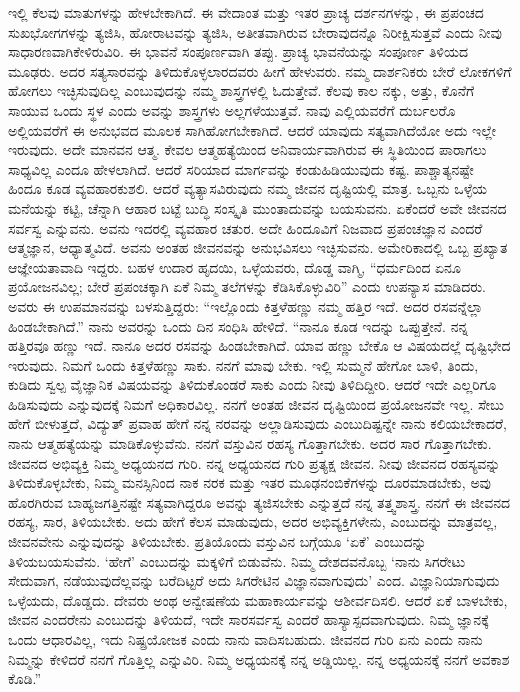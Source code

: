 \vskip 0.2cm 

ಇಲ್ಲಿ ಕೆಲವು ಮಾತುಗಳನ್ನು ಹೇಳಬೇಕಾಗಿದೆ. ಈ ವೇದಾಂತ ಮತ್ತು ಇತರ ಪ್ರಾಚ್ಯ ದರ್ಶನಗಳನ್ನು, ಈ ಪ್ರಪಂಚದ ಸುಖಭೋಗಗಳನ್ನು ತ್ಯಜಿಸಿ, ಹೋರಾಟವನ್ನು ತ್ಯಜಿಸಿ, ಅತೀತವಾಗಿರುವ ಬೇರಾವುದನ್ನೊ ನಿರೀಕ್ಷಿಸುತ್ತವೆ ಎಂದು ನೀವು ಸಾಧಾರಣವಾಗಿ\break ಕೇಳಿರುವಿರಿ. ಈ ಭಾವನೆ ಸಂಪೂರ್ಣವಾಗಿ ತಪ್ಪು. ಪ್ರಾಚ್ಯ ಭಾವನೆಯನ್ನು ಸಂಪೂರ್ಣ ತಿಳಿಯದ ಮೂಢರು. ಅದರ ಸತ್ಯಸಾರವನ್ನು ತಿಳಿದುಕೊಳ್ಳಲಾರದವರು ಹೀಗೆ ಹೇಳುವರು. ನಮ್ಮ ದಾರ್ಶನಿಕರು ಬೇರೆ ಲೋಕಗಳಿಗೆ ಹೋಗಲು ಇಚ್ಛಿಸುವುದಿಲ್ಲ ಎಂಬುವುದನ್ನು ನಮ್ಮ ಶಾಸ್ತ್ರಗಳಲ್ಲಿ ಓದುತ್ತೇವೆ. ಕೆಲವು ಕಾಲ ನಕ್ಕು, ಅತ್ತು, ಕೊನೆಗೆ ಸಾಯುವ ಒಂದು ಸ್ಥಳ ಎಂದು ಅವನ್ನು ಶಾಸ್ತ್ರಗಳು ಅಲ್ಲಗಳೆಯುತ್ತವೆ. ನಾವು ಎಲ್ಲಿಯವರೆಗೆ ದುರ್ಬಲರೊ ಅಲ್ಲಿಯವರೆಗೆ ಈ ಅನುಭವದ ಮೂಲಕ ಸಾಗಿಹೋಗಬೇಕಾಗಿದೆ. ಆದರೆ ಯಾವುದು ಸತ್ಯವಾಗಿದೆಯೋ ಅದು ಇಲ್ಲೇ ಇರುವುದು. ಅದೇ ಮಾನವನ ಆತ್ಮ. ಕೇವಲ ಆತ್ಮಹತ್ಯೆಯಿಂದ ಅನಿವಾರ್ಯವಾಗಿರುವ ಈ ಸ್ಥಿತಿಯಿಂದ ಪಾರಾಗಲು ಸಾಧ್ಯವಿಲ್ಲ ಎಂದೂ ಹೇಳಲಾಗಿದೆ. ಆದರೆ ಸರಿಯಾದ ಮಾರ್ಗವನ್ನು ಕಂಡುಹಿಡಿಯುವುದು ಕಷ್ಟ. ಪಾಶ್ಚಾತ್ಯನಷ್ಟೇ ಹಿಂದೂ ಕೂಡ ವ್ಯವಹಾರಕುಶಲಿ. ಆದರೆ ವ್ಯತ್ಯಾಸವಿರುವುದು ನಮ್ಮ ಜೀವನ ದೃಷ್ಟಿಯಲ್ಲಿ ಮಾತ್ರ. ಒಬ್ಬನು ಒಳ್ಳೆಯ ಮನೆಯನ್ನು ಕಟ್ಟಿ, ಚೆನ್ನಾಗಿ ಆಹಾರ ಬಟ್ಟೆ ಬುದ್ಧಿ ಸಂಸ್ಕೃತಿ ಮುಂತಾದುವನ್ನು ಬಯಸುವನು. ಏಕೆಂದರೆ ಅವೇ ಜೀವನದ ಸರ್ವಸ್ವ ಎನ್ನುವನು. ಅವನು ಇದರಲ್ಲಿ ವ್ಯವಹಾರ ಚತುರ. ಅದೇ ಹಿಂದೂವಿಗೆ ನಿಜವಾದ ಪ್ರಪಂಚಜ್ಞಾನ ಎಂದರೆ ಆತ್ಮಜ್ಞಾನ, ಆಧ್ಯಾತ್ಮವಿದೆ. ಅವನು ಅಂತಹ ಜೀವನವನ್ನು ಅನುಭವಿಸಲು ಇಚ್ಛಿಸುವನು. ಅಮೇರಿಕಾದಲ್ಲಿ ಒಬ್ಬ ಪ್ರಖ್ಯಾತ ಆಜ್ಞೇಯತಾವಾದಿ ಇದ್ದರು. ಬಹಳ ಉದಾರ ಹೃದಯಿ, ಒಳ್ಳೆಯವರು, ದೊಡ್ಡ ವಾಗ್ಮಿ, “ಧರ್ಮದಿಂದ ಏನೂ ಪ್ರಯೋಜನವಿಲ್ಲ; ಬೇರೆ ಪ್ರಪಂಚಕ್ಕಾಗಿ ಏಕೆ ನಿಮ್ಮ ತಲೆಗಳನ್ನು ಕೆಡಿಸಿಕೊಳ್ಳುವಿರಿ” ಎಂದು ಉಪನ್ಯಾಸ ಮಾಡಿದರು. ಅವರು ಈ ಉಪಮಾನವನ್ನು ಬಳಸುತ್ತಿದ್ದರು: “ಇಲ್ಲೊಂದು ಕಿತ್ತಳೆಹಣ್ಣು ನಮ್ಮ ಹತ್ತಿರ ಇದೆ. ಅದರ ರಸವನ್ನೆಲ್ಲಾ ಹಿಂಡಬೇಕಾಗಿದೆ.” ನಾನು ಅವರನ್ನು ಒಂದು ದಿನ ಸಂಧಿಸಿ ಹೇಳಿದೆ. “ನಾನೂ ಕೂಡ ಇದನ್ನು ಒಪ್ಪುತ್ತೇನೆ. ನನ್ನ ಹತ್ತಿರವೂ ಹಣ್ಣು ಇದೆ. ನಾನೂ ಅದರ ರಸವನ್ನು ಹಿಂಡಬೇಕಾಗಿದೆ. ಯಾವ ಹಣ್ಣು ಬೇಕೊ ಆ ವಿಷಯದಲ್ಲೆ ದೃಷ್ಟಿಭೇದ ಇರುವುದು. ನಿಮಗೆ ಒಂದು ಕಿತ್ತಳೆಹಣ್ಣು ಸಾಕು. ನನಗೆ ಮಾವು ಬೇಕು. ಇಲ್ಲಿ ಸುಮ್ಮನೆ ಹೇಗೋ ಬಾಳಿ, ತಿಂದು, ಕುಡಿದು ಸ್ವಲ್ಪ ವೈಜ್ಞಾನಿಕ ವಿಷಯವನ್ನು ತಿಳಿದುಕೊಂಡರೆ ಸಾಕು ಎಂದು ನೀವು ತಿಳಿದಿದ್ದೀರಿ. ಆದರೆ ಇದೇ ಎಲ್ಲರಿಗೂ ಹಿಡಿಸುವುದು ಎನ್ನುವುದಕ್ಕೆ ನಿಮಗೆ ಅಧಿಕಾರವಿಲ್ಲ. ನನಗೆ ಅಂತಹ ಜೀವನ ದೃಷ್ಟಿಯಿಂದ ಪ್ರಯೋಜನವೇ ಇಲ್ಲ. ಸೇಬು ಹೇಗೆ ಬೀಳುತ್ತದೆ, ವಿದ್ಯುತ್​ ಪ್ರವಾಹ ಹೇಗೆ ನನ್ನ ನರವನ್ನು ಅಲ್ಲಾಡಿಸುವುದು ಎಂಬುದಿಷ್ಟನ್ನೇ ನಾನು ಕಲಿಯಬೇಕಾದರೆ, ನಾನು ಆತ್ಮಹತ್ಯೆಯನ್ನು ಮಾಡಿಕೊಳ್ಳುವೆನು. ನನಗೆ ವಸ್ತುವಿನ ರಹಸ್ಯ ಗೊತ್ತಾಗಬೇಕು. ಅದರ ಸಾರ ಗೊತ್ತಾಗಬೇಕು. ಜೀವನದ ಅಭಿವ್ಯಕ್ತಿ ನಿಮ್ಮ ಅಧ್ಯಯನದ ಗುರಿ. ನನ್ನ ಅಧ್ಯಯನದ ಗುರಿ ಪ್ರತ್ಯಕ್ಷ ಜೀವನ. ನೀವು ಜೀವನದ ರಹಸ್ಯವನ್ನು ತಿಳಿದುಕೊಳ್ಳಬೇಕು, ನಿಮ್ಮ ಮನಸ್ಸಿನಿಂದ ನಾಕ ನರಕ ಮತ್ತು ಇತರ ಮೂಢನಂಬಿಕೆಗಳನ್ನು ದೂರಮಾಡಬೇಕು, ಅವು ಹೊರಗಿರುವ ಬಾಹ್ಯಜಗತ್ತಿನಷ್ಟೇ ಸತ್ಯವಾಗಿದ್ದರೂ ಅವನ್ನು ತ್ಯಜಿಸಬೇಕು ಎನ್ನುತ್ತದೆ ನನ್ನ ತತ್ತ್ವಶಾಸ್ತ್ರ. ನನಗೆ ಈ ಜೀವನದ ರಹಸ್ಯ, ಸಾರ, ತಿಳಿಯಬೇಕು. ಅದು ಹೇಗೆ ಕೆಲಸ ಮಾಡುವುದು, ಅದರ ಅಭಿವ್ಯಕ್ತಿಗಳೇನು, ಎಂಬುದನ್ನು ಮಾತ್ರವಲ್ಲ, ಜೀವನವೇನು ಎನ್ನುವುದನ್ನು ತಿಳಿಯಬೇಕು. ಪ್ರತಿಯೊಂದು ವಸ್ತುವಿನ ಬಗ್ಗೆಯೂ ‘ಏಕೆ’ ಎಂಬುದನ್ನು ತಿಳಿಯಬಯಸುವೆನು. ‘ಹೇಗೆ’ ಎಂಬುದನ್ನು ಮಕ್ಕಳಿಗೆ ಬಿಡುವೆನು. ನಿಮ್ಮ ದೇಶದವನೊಬ್ಬ ‘ನಾನು ಸಿಗರೇಟು ಸೇದುವಾಗ, ನಡೆಯುವುದೆಲ್ಲವನ್ನು ಬರೆದಿಟ್ಟರೆ ಅದು ಸಿಗರೇಟಿನ ವಿಜ್ಞಾನವಾಗುವುದು’ ಎಂದ. ವಿಜ್ಞಾನಿಯಾಗುವುದು ಒಳ್ಳೆಯದು, ದೊಡ್ಡದು. ದೇವರು ಅಂಥ ಅನ್ವೇಷಣೆಯ ಮಹಾಕಾರ್ಯವನ್ನು ಆಶೀರ್ವದಿಸಲಿ. ಆದರೆ ಏಕೆ ಬಾಳಬೇಕು, ಜೀವನ ಎಂದರೇನು ಎಂಬುದನ್ನು ತಿಳಿಯದೆ, ಇದೇ ಸಾರಸರ್ವಸ್ವ ಎಂದರೆ ಹಾಸ್ಯಾಸ್ಪದವಾಗುವುದು. ನಿಮ್ಮ ಜ್ಞಾನಕ್ಕೆ ಒಂದು ಆಧಾರವಿಲ್ಲ, ಇದು ನಿಷ್ಪ್ರಯೋಜಕ ಎಂದು ನಾನು ವಾದಿಸಬಹುದು. ಜೀವನದ ಗುರಿ ಏನು ಎಂದು ನಾನು ನಿಮ್ಮನ್ನು ಕೇಳಿದರೆ ನನಗೆ ಗೊತ್ತಿಲ್ಲ ಎನ್ನುವಿರಿ. ನಿಮ್ಮ ಅಧ್ಯಯನಕ್ಕೆ ನನ್ನ ಅಡ್ಡಿಯಿಲ್ಲ. ನನ್ನ ಅಧ್ಯಯನಕ್ಕೆ ನನಗೆ ಅವಕಾಶ ಕೊಡಿ.”

